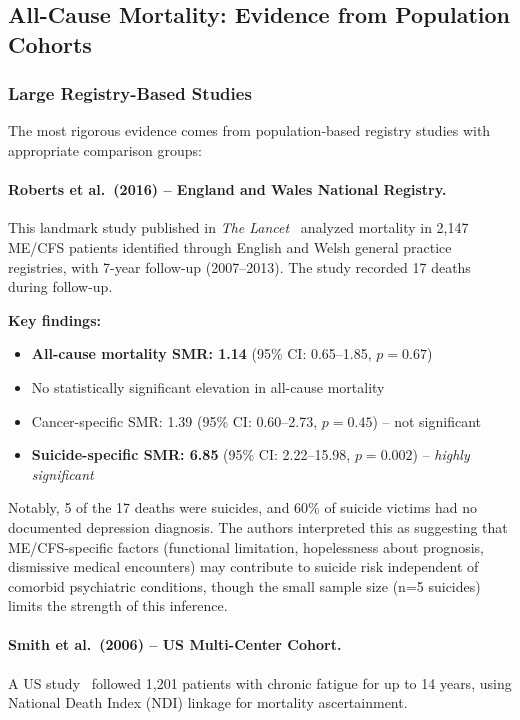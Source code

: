 \subsection{All-Cause Mortality: Evidence from Population Cohorts}
\label{subsec:all-cause-mortality}

\subsubsection{Large Registry-Based Studies}

The most rigorous evidence comes from population-based registry studies with appropriate comparison groups:

\paragraph{Roberts et al.\ (2016) -- England and Wales National Registry.}
This landmark study published in \textit{The Lancet}~\cite{Roberts2016} analyzed mortality in 2,147 ME/CFS patients identified through English and Welsh general practice registries, with 7-year follow-up (2007--2013). The study recorded 17 deaths during follow-up.

\textbf{Key findings:}
\begin{itemize}
    \item \textbf{All-cause mortality SMR: 1.14} (95\% CI: 0.65--1.85, $p = 0.67$)
    \item No statistically significant elevation in all-cause mortality
    \item Cancer-specific SMR: 1.39 (95\% CI: 0.60--2.73, $p = 0.45$) -- not significant
    \item \textbf{Suicide-specific SMR: 6.85} (95\% CI: 2.22--15.98, $p = 0.002$) -- \textit{highly significant}
\end{itemize}

Notably, 5 of the 17 deaths were suicides, and 60\% of suicide victims had no documented depression diagnosis. The authors interpreted this as suggesting that ME/CFS-specific factors (functional limitation, hopelessness about prognosis, dismissive medical encounters) may contribute to suicide risk independent of comorbid psychiatric conditions, though the small sample size (n=5 suicides) limits the strength of this inference.

\paragraph{Smith et al.\ (2006) -- US Multi-Center Cohort.}
A US study~\cite{Smith2006} followed 1,201 patients with chronic fatigue for up to 14 years, using National Death Index (NDI) linkage for mortality ascertainment.

